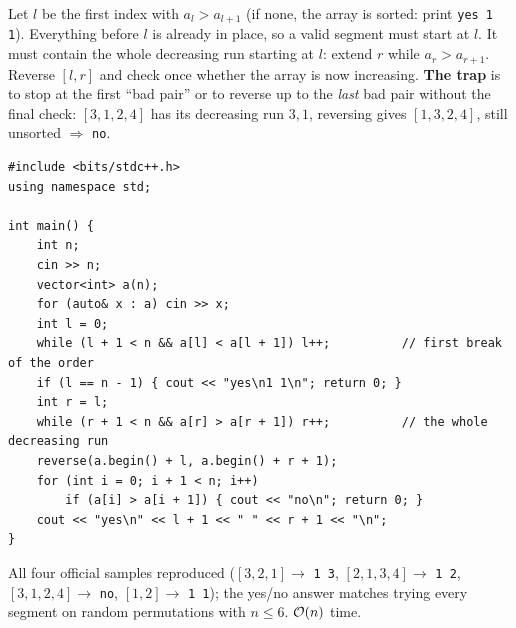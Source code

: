 \begin{solutionbox}
Let $l$ be the first index with $a_l > a_{l+1}$ (if none, the array is sorted: print \texttt{yes 1 1}). Everything before $l$ is already in place, so a valid segment must start at $l$. It must contain the whole decreasing run starting at $l$: extend $r$ while $a_r > a_{r+1}$. Reverse $[l, r]$ and check once whether the array is now increasing. \textbf{The trap} is to stop at the first ``bad pair'' or to reverse up to the \emph{last} bad pair without the final check: $[3,1,2,4]$ has its decreasing run $3,1$, reversing gives $[1,3,2,4]$, still unsorted $\Rightarrow$ \texttt{no}.
\begin{lstlisting}[style=cpp]
#include <bits/stdc++.h>
using namespace std;

int main() {
    int n;
    cin >> n;
    vector<int> a(n);
    for (auto& x : a) cin >> x;
    int l = 0;
    while (l + 1 < n && a[l] < a[l + 1]) l++;          // first break of the order
    if (l == n - 1) { cout << "yes\n1 1\n"; return 0; }
    int r = l;
    while (r + 1 < n && a[r] > a[r + 1]) r++;          // the whole decreasing run
    reverse(a.begin() + l, a.begin() + r + 1);
    for (int i = 0; i + 1 < n; i++)
        if (a[i] > a[i + 1]) { cout << "no\n"; return 0; }
    cout << "yes\n" << l + 1 << " " << r + 1 << "\n";
}
\end{lstlisting}
All four official samples reproduced ($[3,2,1] \to$ \texttt{1 3}, $[2,1,3,4] \to$ \texttt{1 2}, $[3,1,2,4] \to$ \texttt{no}, $[1,2] \to$ \texttt{1 1}); the yes/no answer matches trying every segment on random permutations with $n \le 6$. $\mathcal{O}(n)$ time.
\end{solutionbox}
